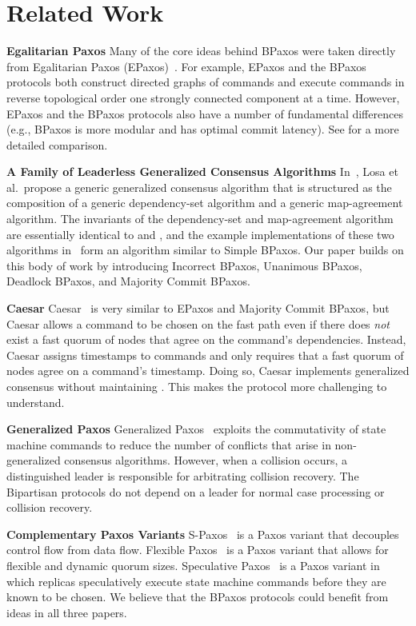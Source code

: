 \section{Related Work}
\newcommand{\condensedparagraph}[1]{\textbf{#1}\;}

\condensedparagraph{Egalitarian Paxos}
Many of the core ideas behind BPaxos were taken directly from Egalitarian Paxos
(EPaxos)~\cite{moraru2013there, moraru2013proof}. For example, EPaxos and the
BPaxos protocols both construct directed graphs of commands and execute
commands in reverse topological order one strongly connected component at a
time. However, EPaxos and the BPaxos protocols also have a number of
fundamental differences (e.g., BPaxos is more modular and has optimal commit
latency). See  for a more detailed comparison.

\condensedparagraph{A Family of Leaderless Generalized Consensus Algorithms}
In~\cite{losa2016brief}, Losa et al.\ propose a generic generalized consensus
algorithm that is structured as the composition of a generic dependency-set
algorithm and a generic map-agreement algorithm. The invariants of the
dependency-set and map-agreement algorithm are essentially identical to
 and , and the example
implementations of these two algorithms in~\cite{losa2016brief} form an
algorithm similar to Simple BPaxos. Our paper builds on this body of work by
introducing Incorrect BPaxos, Unanimous BPaxos, Deadlock BPaxos, and Majority
Commit BPaxos.

\condensedparagraph{Caesar}
Caesar~\cite{arun2017speeding} is very similar to EPaxos and Majority Commit
BPaxos, but Caesar allows a command to be chosen on the fast path even if there
does \emph{not} exist a fast quorum of nodes that agree on the command's
dependencies. Instead, Caesar assigns timestamps to commands and only requires
that a fast quorum of nodes agree on a command's timestamp. Doing so, Caesar
implements generalized consensus without maintaining
. This makes the protocol more challenging to
understand.

\condensedparagraph{Generalized Paxos}
Generalized Paxos~\cite{lamport2005generalized} exploits the commutativity of
state machine commands to reduce the number of conflicts that arise in
non-generalized consensus algorithms. However, when a collision occurs, a
distinguished leader is responsible for arbitrating collision recovery. The
Bipartisan protocols do not depend on a leader for normal case processing or
collision recovery.

\condensedparagraph{Complementary Paxos Variants}
S-Paxos~\cite{biely2012s} is a Paxos variant that decouples control flow from
data flow. Flexible Paxos~\cite{howard2016flexible} is a Paxos variant that
allows for flexible and dynamic quorum sizes. Speculative
Paxos~\cite{ports2015designing} is a Paxos variant in which replicas
speculatively execute state machine commands before they are known to be
chosen. We believe that the BPaxos protocols could benefit from ideas in all
three papers.

